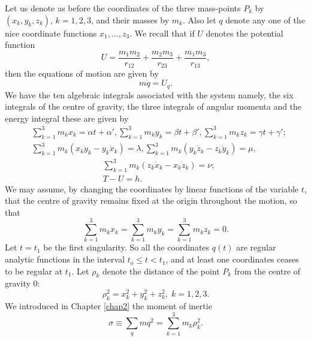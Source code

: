 Let us denote as before the coordinates of the three mass-points $P_k$
by $(x_k, y_k,z_k)$, $k =1,2,3$, and their masses by $m_k$. Also let
$q$ denote any one of the nice coordinate functions $x_1, \ldots,
z_3$. We recall that if $U$ denotes the potential function 
\begin{equation*}
U= \frac{m_1m_2}{r_{12}} + \frac{m_2m_3}{r_{23}} +
\frac{m_1m_3}{r_{13}}, \tag{3.1.1}\label{chap3:eq3.1.1} 
\end{equation*}
then the equations of motion are given by
\begin{equation*}
m \dot{q} = U_q.\tag{3.1.2}\label{chap3:eq3.1.2}
\end{equation*}
We have the ten algebraic integrals associated with the system namely,
the six integrals of the centre of gravity, the three integrals of
angular momenta and the energy integral these are given by 
\begin{align*}
& \sum\limits^3_{k=1} m_k x_k = \alpha t+ \alpha', \sum\limits^3_{k=1}
  m_k y_k = \beta t + \beta', \sum\limits^3_{k=1} m_k z_k = \gamma t +
  \gamma';\\ 
& \sum\limits^3_{k=1} m_k (x_k \dot{y}_k - y_k \dot{x}_k) = \lambda,
  \sum\limits^3_{k=1} m_k (y_k \dot{z}_k - z_k \dot{y}_k) = \mu, 
\end{align*}\pageoriginale
\begin{align*}
& \sum\limits^3_{k=1} m_k (z_k \dot{x}_k - x_k \dot{z}_k) = \nu;
  \tag{3.1.3}\label{chap3:eq3.1.3}\\ 
& T - U = h. \tag{3.1.4}\label{chap3:eq3.1.4}
\end{align*}
We may assume, by changing the coordinates by linear functions of the
variable $t$, that the centre of gravity remains fixed at the origin
throughout the motion, so that 
\begin{equation*}
\sum\limits^3_{k=1} m_k x_k = \sum\limits^3_{k=1} m_k y_k = \sum\limits^3_{k=1} m_k z_k = 0. 
\tag{3.1.5}\label{chap3:eq3.1.5}
\end{equation*}
Let $t = t_1$ be the first singularity. So all the coordinates $q(t)$
are regular analytic functions in the interval $t_o \leq t < t_1$, and
at least one coordinates ceases to be regular at $t_1$. Let $\rho_k$
denote the distance of the point $P_k$ from the centre of gravity 0: 
\begin{equation*}
\rho^2_k = x^2_k + y^2_k + z^2_k, \; k  =1,2,3.
\tag{3.1.6}\label{chap3:eq3.1.6} 
\end{equation*}
We introduced in Chapter \ref{chap2} the moment of inertie
\begin{equation*}
\sigma \equiv \sum_q mq^2 = \sum\limits^3_{k=1} m_k
\rho^2_k. \tag{3.1.7}\label{chap3:eq3.1.7} 
\end{equation*}
